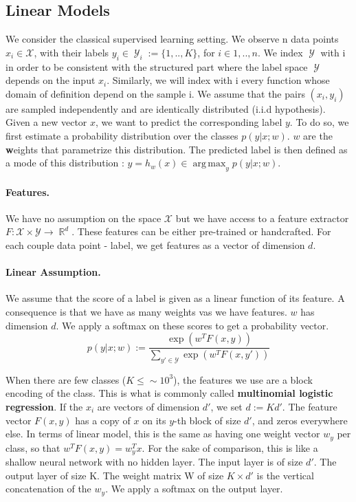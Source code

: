 \documentclass{article}
\DeclareMathOperator{\R}{\mathbb{R}}
\DeclareMathOperator{\1}{\mathbb{1}}
\DeclareMathOperator{\Y}{\mathcal{Y}}
\DeclareMathOperator*{\argmax}{arg\,max}
\begin{document}
\subsection{Linear Models}

We consider the classical supervised learning setting.
We observe n data points $x_i \in \mathcal{X}$, with their labels $y_i\in \Y_i:= \{1,..,K\}$, for $i \in {1,..,n}$.
We index $\Y$ with i in order to be consistent with the structured part where the label space $\Y$ depends on the input $x_i$.
Similarly, we will index with i every function  whose domain of definition depend on the sample i.
We assume that the pairs $(x_i, y_i)$ are sampled independently and are identically distributed (i.i.d hypothesis).
Given a new vector $x$, we want to predict the corresponding label $y$. 
To do so, we first estimate a probability distribution over the classes $p(y|x ; w)$.
$w$ are the \textbf{w}eights that parametrize this distribution. 
The predicted label is then defined as a mode of this distribution : $\hat y = h_w(x) \in \argmax_y p(y| x ; w)$.

\paragraph{Features.}
We have no assumption on the space $\mathcal X$ but we have access to a feature extractor $F:\mathcal X \times \mathcal Y \rightarrow \R^d$.
These features can be either pre-trained or handcrafted.
For each couple data point - label, we get features as a vector of dimension $d$.

\paragraph{Linear Assumption.}
We assume that the score of a label is given as a linear function of its feature.
A consequence is that we have as many weights vas we have  features.
$w$ has dimension $d$.
We apply a softmax on these scores to get a probability vector. 
\begin{equation}
	\label{primal probability}
	p(y | x ; w) := \frac{\exp(w^TF(x, y))}{\sum_{y' \in \mathcal{Y}} \exp(w^TF(x, y'))}
\end{equation}

When there are few classes ($K \leq \sim 10^3$), the features we use are a block encoding of the class.
This is what is commonly called \textbf{multinomial logistic regression}.
If the $x_i$ are vectors of dimension $d'$, we set $d:=Kd'$. The feature vector $F(x, y)$ has a copy of $x$ on its $y$-th block of size $d'$, and zeros everywhere else.
In terms of linear model, this is the same as having one weight vector $w_y$ per class, so that $w^TF(x, y) = w_y^Tx$.
For the sake of comparison, this is like a shallow neural network with no hidden layer.
The input layer is of size $d'$.
The output layer of size K.
The weight matrix W of size $K \times d'$ is the vertical concatenation of the $w_y$.
We apply a softmax on the output layer.
\end{document}
